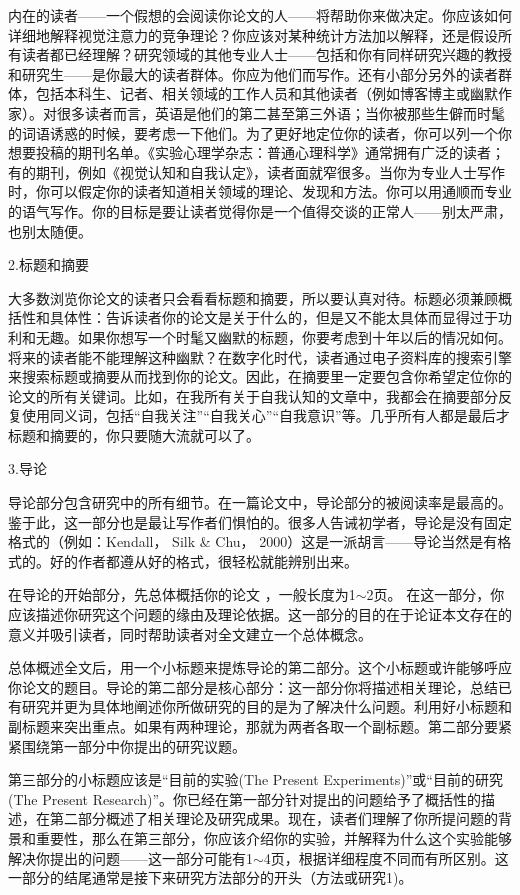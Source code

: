 内在的读者——一个假想的会阅读你论文的人——将帮助你来做决定。你应该如何详细地解释视觉注意力的竞争理论？你应该对某种统计方法加以解释，还是假设所有读者都已经理解？研究领域的其他专业人士——包括和你有同样研究兴趣的教授和研究生——是你最大的读者群体。你应为他们而写作。还有小部分另外的读者群体，包括本科生、记者、相关领域的工作人员和其他读者（例如博客博主或幽默作家）。对很多读者而言，英语是他们的第二甚至第三外语；当你被那些生僻而时髦的词语诱惑的时候，要考虑一下他们。为了更好地定位你的读者，你可以列一个你想要投稿的期刊名单。《实验心理学杂志：普通心理科学》通常拥有广泛的读者；有的期刊，例如《视觉认知和自我认定》，读者面就窄很多。当你为专业人士写作时，你可以假定你的读者知道相关领域的理论、发现和方法。你可以用通顺而专业的语气写作。你的目标是要让读者觉得你是一个值得交谈的正常人——别太严肃，也别太随便。


{\kaishu 2.标题和摘要}

大多数浏览你论文的读者只会看看标题和摘要，所以要认真对待。标题必须兼顾概括性和具体性：告诉读者你的论文是关于什么的，但是又不能太具体而显得过于功利和无趣。如果你想写一个时髦又幽默的标题，你要考虑到十年以后的情况如何。将来的读者能不能理解这种幽默？在数字化时代，读者通过电子资料库的搜索引擎来搜索标题或摘要从而找到你的论文。因此，在摘要里一定要包含你希望定位你的论文的所有关键词。比如，在我所有关于自我认知的文章中，我都会在摘要部分反复使用同义词，包括“自我关注”“自我关心”“自我意识”等。几乎所有人都是最后才标题和摘要的，你只要随大流就可以了。

{\kaishu 3.导论}

导论部分包含研究中的所有细节。在一篇论文中，导论部分的被阅读率是最高的。鉴于此，这一部分也是最让写作者们惧怕的。很多人告诫初学者，导论是没有固定格式的（例如：Kendall， Silk \& Chu， 2000）这是一派胡言——导论当然是有格式的。好的作者都遵从好的格式，很轻松就能辨别出来。

在导论的开始部分，先总体概括你的论文 ，一般长度为1$\sim$2页。 在这一部分，你应该描述你研究这个问题的缘由及理论依据。这一部分的目的在于论证本文存在的意义并吸引读者，同时帮助读者对全文建立一个总体概念。

总体概述全文后，用一个小标题来提炼导论的第二部分。这个小标题或许能够呼应你论文的题目。导论的第二部分是核心部分：这一部分你将描述相关理论，总结已有研究并更为具体地阐述你所做研究的目的是为了解决什么问题。利用好小标题和副标题来突出重点。如果有两种理论，那就为两者各取一个副标题。第二部分要紧紧围绕第一部分中你提出的研究议题。

第三部分的小标题应该是“目前的实验(The Present Experiments)”或“目前的研究(The Present Research)”。你已经在第一部分针对提出的问题给予了概括性的描述，在第二部分概述了相关理论及研究成果。现在，读者们理解了你所提问题的背景和重要性，那么在第三部分，你应该介绍你的实验，并解释为什么这个实验能够解决你提出的问题——这一部分可能有1$\sim$4页，根据详细程度不同而有所区别。这一部分的结尾通常是接下来研究方法部分的开头（方法或研究1)。

